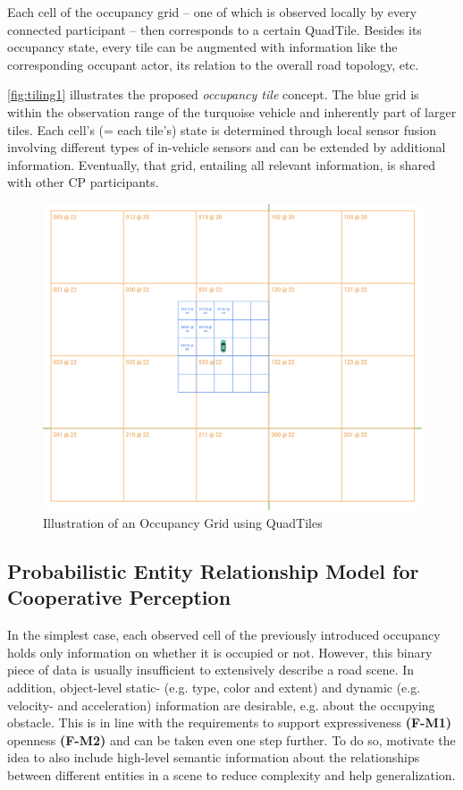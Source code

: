 Each cell of the occupancy grid – one of which is observed locally by every connected participant – then corresponds to a certain QuadTile. Besides its occupancy state, every tile can be augmented with information like the corresponding occupant actor, its relation to the overall road topology, etc. 

\autoref{fig:tiling1} illustrates the proposed \textit{occupancy tile} concept. The blue grid is within the observation range of the turquoise vehicle and inherently part of larger tiles. Each cell's (= each tile's) state is determined through local sensor fusion involving different types of in-vehicle sensors and can be extended by additional information. Eventually, that grid, entailing all relevant information, is shared with other CP participants.

\begin{figure}[h]
	\centering
	\includegraphics[width=1.0\linewidth]{98_images/geo_subscription_schema_1}
	\caption{Illustration of an Occupancy Grid using QuadTiles}
	\label{fig:tiling1}
\end{figure}


\subsection{Probabilistic Entity Relationship Model for Cooperative Perception}
\label{subsec:concept_design:probabilistic_entity_relationship_model_for_cooperative_perception}

In the simplest case, each observed cell of the previously introduced occupancy holds only information on whether it is occupied or not. However, this binary piece of data is usually insufficient to extensively describe a road scene. In addition, object-level static- (e.g. type, color and extent) and dynamic (e.g. velocity- and acceleration) information are desirable, e.g. about the occupying obstacle. This is in line with the requirements to support expressiveness \textbf{(F-M1)} openness \textbf{(F-M2)} and can be taken even one step further. To do so, \cite{Kohlhaas2014, Petrich2018} motivate the idea to also include high-level semantic information about the relationships between different entities in a scene to reduce complexity and help generalization. 

